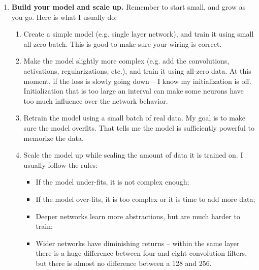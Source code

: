 \begin{enumerate}
\item {\bf Build your model and scale up.}
Remember to start small, and grow as you go.
Here is what I usually do:
 \begin{enumerate}
 \item Create a simple model (e.g. single layer network), and train it using small all-zero batch. This is good to make sure your wiring is correct.
 \item Make the model slightly more complex (e.g. add the convolutions, activations, regularizations, etc.), and train it using all-zero data.
 At this moment, if the loss is slowly going down -- I know my initialization is off.
 Initialization that is too large an interval can make some neurons have too much influence over the network behavior.
 \item Retrain the model using a small batch of real data.
 My goal is to make sure the model overfits.
 That tells me the model is sufficiently powerful to memorize the data.
 \item Scale the model up while scaling the amount of data it is trained on.
 I usually follow the rules:
  \begin{itemize}
  \item If the model under-fits, it is not complex enough;
  \item If the model over-fits, it is too complex or it is time to add more data;
  \item Deeper networks learn more abstractions, but are much harder to train;
  \item Wider networks have diminishing returns -- within the same layer there is a huge difference between four and eight convolution filters, but there is almost no difference between a 128 and 256.
  \end{itemize}
 \end{enumerate}
\end{enumerate}
